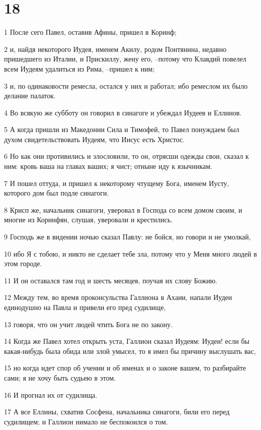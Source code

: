 \chapter{18}

\par 1 После сего Павел, оставив Афины, пришел в Коринф;
\par 2 и, найдя некоторого Иудея, именем Акилу, родом Понтянина, недавно пришедшего из Италии, и Прискиллу, жену его, --потому что Клавдий повелел всем Иудеям удалиться из Рима, --пришел к ним;
\par 3 и, по одинаковости ремесла, остался у них и работал; ибо ремеслом их было делание палаток.
\par 4 Во всякую же субботу он говорил в синагоге и убеждал Иудеев и Еллинов.
\par 5 А когда пришли из Македонии Сила и Тимофей, то Павел понуждаем был духом свидетельствовать Иудеям, что Иисус есть Христос.
\par 6 Но как они противились и злословили, то он, отрясши одежды свои, сказал к ним: кровь ваша на главах ваших; я чист; отныне иду к язычникам.
\par 7 И пошел оттуда, и пришел к некоторому чтущему Бога, именем Иусту, которого дом был подле синагоги.
\par 8 Крисп же, начальник синагоги, уверовал в Господа со всем домом своим, и многие из Коринфян, слушая, уверовали и крестились.
\par 9 Господь же в видении ночью сказал Павлу: не бойся, но говори и не умолкай,
\par 10 ибо Я с тобою, и никто не сделает тебе зла, потому что у Меня много людей в этом городе.
\par 11 И он оставался там год и шесть месяцев, поучая их слову Божию.
\par 12 Между тем, во время проконсульства Галлиона в Ахаии, напали Иудеи единодушно на Павла и привели его пред судилище,
\par 13 говоря, что он учит людей чтить Бога не по закону.
\par 14 Когда же Павел хотел открыть уста, Галлион сказал Иудеям: Иудеи! если бы какая-нибудь была обида или злой умысел, то я имел бы причину выслушать вас,
\par 15 но когда идет спор об учении и об именах и о законе вашем, то разбирайте сами; я не хочу быть судьею в этом.
\par 16 И прогнал их от судилища.
\par 17 А все Еллины, схватив Сосфена, начальника синагоги, били его перед судилищем; и Галлион нимало не беспокоился о том.
